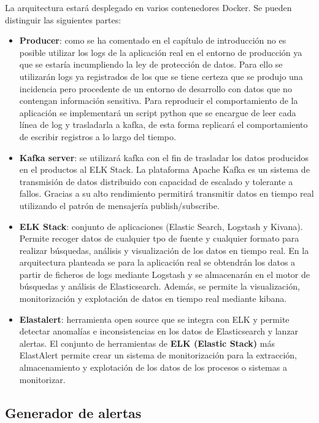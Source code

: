 La arquitectura estará desplegado en varios contenedores Docker. Se pueden distinguir las siguientes partes:

\begin{itemize}
\item \textbf{Producer}: como se ha comentado en el capítulo de introducción no es posible utilizar los logs de la aplicación real en el entorno de producción ya que se estaría incumpliendo la ley de protección de datos. Para ello se utilizarán logs ya registrados de los que se tiene certeza que se produjo una incidencia pero procedente de un entorno de desarrollo con datos que no contengan información sensitiva. Para reproducir el comportamiento de la aplicación se implementará un script python que se encargue de leer cada línea de log y trasladarla a kafka, de esta forma replicará el comportamiento de escribir registros a lo largo del tiempo.

\item \textbf{Kafka server}: se utilizará kafka con el fin de trasladar los datos producidos en el productos al ELK Stack. La plataforma Apache Kafka es un sistema de transmisión de datos distribuido con capacidad de escalado y tolerante a fallos. Gracias a su alto rendimiento permitirá transmitir datos en tiempo real utilizando el patrón de mensajería publish/subscribe. 

\item \textbf{ELK Stack}: conjunto de aplicaciones (Elastic Search, Logstash y Kivana). Permite recoger datos de cualquier tpo de fuente y cualquier formato para realizar búsquedas, análisis y visualización de los datos en tiempo real. En la arquitectura planteada se para la aplicación real se obtendrán los datos a partir de ficheros de logs mediante Logstash y se almacenarán en el motor de búsquedas y análisis de Elasticsearch. Además, se permite la visualización, monitorización y explotación de datos en tiempo real mediante kibana.

\item \textbf{Elastalert}: herramienta open source que se integra con ELK y permite detectar anomalías e inconsistencias en los datos de Elasticsearch y lanzar alertas. El conjunto de herramientas de \textbf{ELK (Elastic Stack)} más ElastAlert permite crear un sistema de monitorización para la extracción, almacenamiento y explotación de los datos de los procesos o sistemas a monitorizar.

\end{itemize}

\subsection{Generador de alertas}

